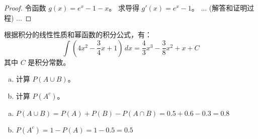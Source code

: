 \documentclass{homework}
\begin{document}
    \begin{proof}
    令函数 $g(x) = e^x - 1 - x$。
    求导得 $g'(x) = e^x - 1$。
    ... (解答和证明过程) ...
    \end{proof}


\begin{solution}
    根据积分的线性性质和幂函数的积分公式，有：
    $$
    \int \left(4x^2 - \frac{3}{4}x + 1\right) \, dx = \frac{4}{3}x^3 - \frac{3}{8}x^2 + x + C
    $$
    其中 $C$ 是积分常数。
\end{solution}

    \begin{enumerate}[(a)]
        \item 计算 $P(A \cup B)$。
        \item 计算 $P(A^c)$。
    \end{enumerate}

\begin{solution}
    \begin{enumerate}[(a)]
        \item $P(A \cup B) = P(A) + P(B) - P(A \cap B) = 0.5 + 0.6 - 0.3 = \mathbf{0.8}$
        \item $P(A^c) = 1 - P(A) = 1 - 0.5 = \mathbf{0.5}$
    \end{enumerate}
\end{solution}
\end{document}
